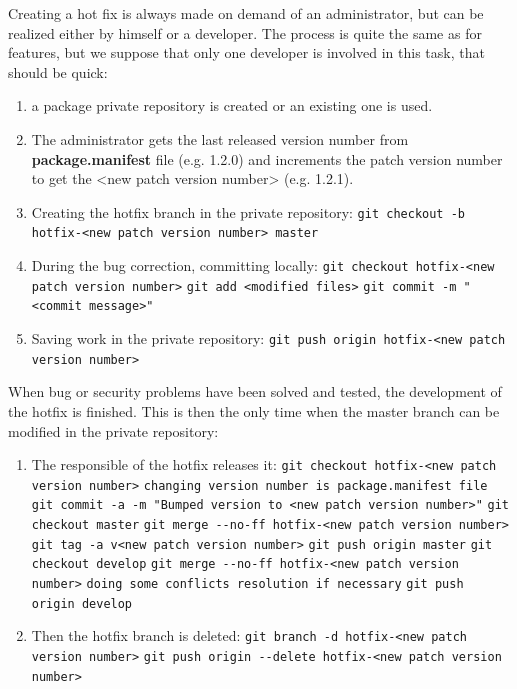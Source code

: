 \documentclass[12pt,a4paper]{article}
\begin{document}
Creating a hot fix is always made on demand of an administrator, but can be realized either by himself or a developer. The process is quite the same as for features, but we suppose that only one developer is involved in this task, that should be quick: 
\begin{enumerate}
\item a package private repository is created or an existing one is used.
\item The administrator gets the last released version number from \textbf{package.manifest} file (e.g. 1.2.0) and increments the patch version number to get the <new patch version number> (e.g. 1.2.1).
\item Creating the hotfix branch in the private repository:
\linebreak  \verb|git checkout -b hotfix-<new patch version number> master|
\item During the bug correction, committing locally:
\linebreak \verb|git checkout hotfix-<new patch version number>|
\linebreak \verb|git add <modified files>|
\linebreak \verb|git commit -m "<commit message>"|
\item Saving work in the private repository:
\linebreak \verb|git push origin hotfix-<new patch version number>|
\end{enumerate}

When bug or security problems have been solved and tested, the development of the hotfix is finished. This is then the only time when the master branch can be modified in the private repository:
\begin{enumerate}
\item The responsible of the hotfix releases it:
\linebreak \verb|git checkout hotfix-<new patch version number>|
\linebreak \verb|changing version number is package.manifest file|
\linebreak \verb|git commit -a -m "Bumped version to <new patch version number>"|
\linebreak \verb|git checkout master|
\linebreak \verb|git merge --no-ff hotfix-<new patch version number>|
\linebreak \verb|git tag -a v<new patch version number>|
\linebreak \verb|git push origin master|
\linebreak \verb|git checkout develop|
\linebreak \verb|git merge --no-ff hotfix-<new patch version number>|
\linebreak \verb|doing some conflicts resolution if necessary|
\linebreak \verb|git push origin develop|
\item Then the hotfix branch is deleted:
\linebreak \verb|git branch -d hotfix-<new patch version number>|
\linebreak \verb|git push origin --delete hotfix-<new patch version number>|
\end{enumerate}
\end{document}
